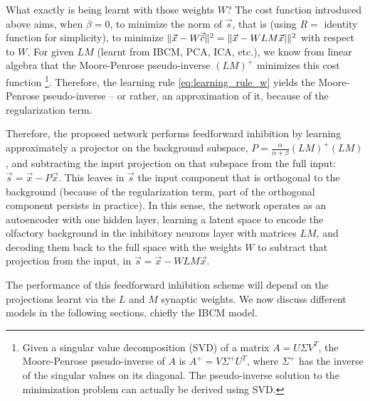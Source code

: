 What exactly is being learnt with those weights $W$? The cost function introduced above aims, when $\beta = 0$, to minimize the norm of $\vec{s}$, that is (using $R = $ identity function for simplicity), to minimize $\| \vec{x} - W \vec{\overline{c}} \|^2 = \| \vec{x} - W LM \vec{x}| \|^2$ with respect to $W$. For given $LM$ (learnt from IBCM, PCA, ICA, etc.), we know from linear algebra that the Moore-Penrose pseudo-inverse $(LM)^+$ minimizes this cost function{\protect
\footnote{Given a singular value decomposition (SVD) of a matrix $A = U \Sigma V^T$, the Moore-Penrose pseudo-inverse of $A$ is $A^+ = V \Sigma^+ U^T$, where $\Sigma^+$ has the inverse of the singular values on its diagonal. The pseudo-inverse solution to the minimization problem can actually be derived using SVD.}}. 
Therefore, the learning rule \eqref{eq:learning_rule_w} yields the Moore-Penrose pseudo-inverse -- or rather, an approximation of it, because of the regularization term. 


Therefore, the proposed network performs feedforward inhibition by learning approximately a projector on the background subspace, $P = \frac{\alpha}{\alpha + \beta}(LM)^+ (LM)$, and subtracting the input projection on that subspace from the full input: $\vec{s} = \vec{x} - P\vec{x}$. This leaves in $\vec{s}$ the input component that is orthogonal to the background (because of the regularization term, part of the orthogonal component persists in practice). In this sense, the network operates as an autoencoder with one hidden layer, learning a latent space to encode the olfactory background in the inhibitory neurons layer with matrices $LM$, and decoding them back to the full space with the weights $W$ to subtract that projection from the input, in $\vec{s} = \vec{x} - WLM \vec{x}$. 

The performance of this feedforward inhibition scheme will depend on the projections learnt via the $L$ and $M$ synaptic weights. We now discuss different models in the following sections, chiefly the IBCM model. 
